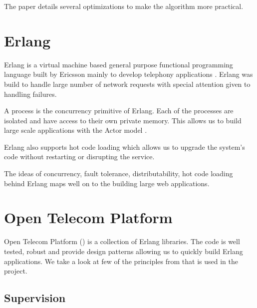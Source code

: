 The paper details several optimizations to make the algorithm more practical.

\section{Erlang}

Erlang \citep{erlang} is a virtual machine based general purpose functional
programming language built by Ericsson mainly to develop telephony applications
\citep{Armstrong07}. Erlang was build to handle large number of network
requests with special attention given to handling failures.

A process is the concurrency primitive of Erlang. Each of the processes are
isolated and have access to their own private memory. This allows us to build
large scale applications with the Actor model%
\citep{Clinger81}.

Erlang also supports hot code loading%
which allows us to upgrade the system's
code without restarting or disrupting the service.

The ideas of concurrency, fault tolerance, distributability, hot code loading
behind Erlang maps well on to the building large web applications.




\section{Open Telecom Platform}
\label{section:concepts.otp}

Open Telecom Platform () is a collection of Erlang libraries.
The  code is
well tested, robust and provide design patterns allowing us to quickly build
Erlang applications. We take a look at few of the principles from 
that is used in the project.

\subsection{Supervision}
\label{section:concepts.supervision}

